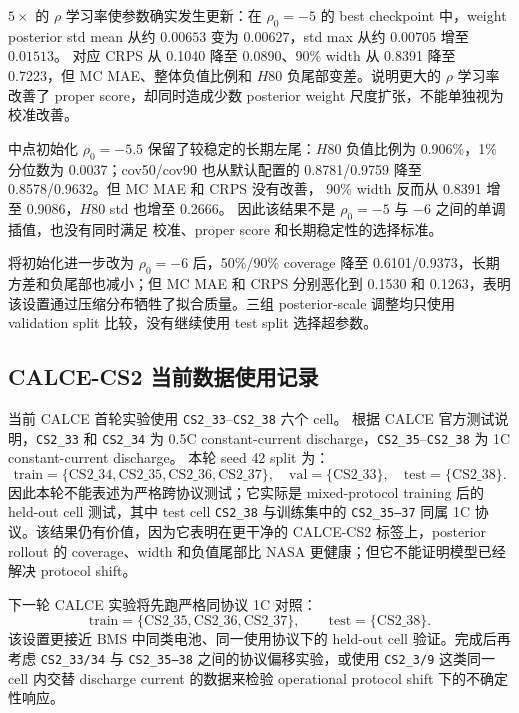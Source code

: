 \documentclass[11pt,a4paper,fontset=none]{ctexart}
\begin{document}
$5\times$ 的 $\rho$ 学习率使参数确实发生更新：在
$\rho_0=-5$ 的 best checkpoint 中，weight posterior std mean 从约
$0.00653$ 变为 $0.00627$，std max 从约 $0.00705$ 增至 $0.01513$。
对应 CRPS 从 0.1040 降至 0.0890、90\% width 从 0.8391 降至
0.7223，但 MC MAE、整体负值比例和 $H80$ 负尾部变差。说明更大的
$\rho$ 学习率改善了 proper score，却同时造成少数 posterior weight
尺度扩张，不能单独视为校准改善。

中点初始化 $\rho_0=-5.5$ 保留了较稳定的长期左尾：$H80$ 负值比例为
0.906\%，1\% 分位数为 0.0037；cov50/cov90 也从默认配置的
0.8781/0.9759 降至 0.8578/0.9632。但 MC MAE 和 CRPS 没有改善，
90\% width 反而从 0.8391 增至 0.9086，$H80$ std 也增至 0.2666。
因此该结果不是 $\rho_0=-5$ 与 $-6$ 之间的单调插值，也没有同时满足
校准、proper score 和长期稳定性的选择标准。

将初始化进一步改为 $\rho_0=-6$ 后，50\%/90\% coverage 降至
0.6101/0.9373，长期方差和负尾部也减小；但 MC MAE 和 CRPS 分别恶化到
0.1530 和 0.1263，表明该设置通过压缩分布牺牲了拟合质量。三组
posterior-scale 调整均只使用 validation split 比较，没有继续使用
test split 选择超参数。

\subsection{CALCE-CS2 当前数据使用记录}

当前 CALCE 首轮实验使用 \texttt{CS2\_33}--\texttt{CS2\_38} 六个 cell。
根据 CALCE 官方测试说明，\texttt{CS2\_33} 和 \texttt{CS2\_34} 为
0.5C constant-current discharge，\texttt{CS2\_35}--\texttt{CS2\_38} 为
1C constant-current discharge。
本轮 seed 42 split 为：
\[
\mathrm{train}=\{\mathrm{CS2\_34,CS2\_35,CS2\_36,CS2\_37}\},\quad
\mathrm{val}=\{\mathrm{CS2\_33}\},\quad
\mathrm{test}=\{\mathrm{CS2\_38}\}.
\]
因此本轮不能表述为严格跨协议测试；它实际是 mixed-protocol training
后的 held-out cell 测试，其中 test cell \texttt{CS2\_38} 与训练集中的
\texttt{CS2\_35--37} 同属 1C 协议。该结果仍有价值，因为它表明在更干净的
CALCE-CS2 标签上，posterior rollout 的 coverage、width 和负值尾部比
NASA 更健康；但它不能证明模型已经解决 protocol shift。

下一轮 CALCE 实验将先跑严格同协议 1C 对照：
\[
\mathrm{train}=\{\mathrm{CS2\_35,CS2\_36,CS2\_37}\},\qquad
\mathrm{test}=\{\mathrm{CS2\_38}\}.
\]
该设置更接近 BMS 中同类电池、同一使用协议下的 held-out cell 验证。完成后再考虑
\texttt{CS2\_33/34} 与 \texttt{CS2\_35--38} 之间的协议偏移实验，或使用
\texttt{CS2\_3/9} 这类同一 cell 内交替 discharge current 的数据来检验
operational protocol shift 下的不确定性响应。
\end{document}
